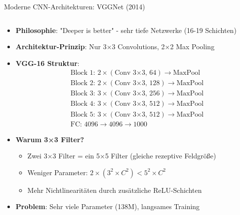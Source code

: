 \documentclass[aspectratio=1610, xcolor=dvipsnames, 9pt]{beamer}
\begin{document}
      \begin{frame}{Moderne CNN-Architekturen: VGGNet (2014)}
        \begin{columns}
          \begin{column}{1\textwidth}
            \begin{itemize}
              \item \textbf{Philosophie}: "Deeper is better" - sehr tiefe Netzwerke (16-19 Schichten)
              \item \textbf{Architektur-Prinzip}: Nur 3×3 Convolutions, 2×2 Max Pooling
              \item \textbf{VGG-16 Struktur}:
              \begin{equation}
                \begin{aligned}
                &\text{Block 1: } 2 \times (\text{Conv 3×3, 64}) \rightarrow \text{MaxPool} \\
                &\text{Block 2: } 2 \times (\text{Conv 3×3, 128}) \rightarrow \text{MaxPool} \\
                &\text{Block 3: } 3 \times (\text{Conv 3×3, 256}) \rightarrow \text{MaxPool} \\
                &\text{Block 4: } 3 \times (\text{Conv 3×3, 512}) \rightarrow \text{MaxPool} \\
                &\text{Block 5: } 3 \times (\text{Conv 3×3, 512}) \rightarrow \text{MaxPool} \\
                &\text{FC: } 4096 \rightarrow 4096 \rightarrow 1000
                \end{aligned}
              \end{equation}
              \item \textbf{Warum 3×3 Filter?}
              \begin{itemize}
                \item Zwei 3×3 Filter = ein 5×5 Filter (gleiche rezeptive Feldgröße)
                \item Weniger Parameter: $2 \times (3^2 \times C^2) < 5^2 \times C^2$
                \item Mehr Nichtlinearitäten durch zusätzliche ReLU-Schichten
              \end{itemize}
              \item \textbf{Problem}: Sehr viele Parameter (138M), langsames Training
            \end{itemize}
          \end{column}
        \end{columns}
      \end{frame}
\end{document}
